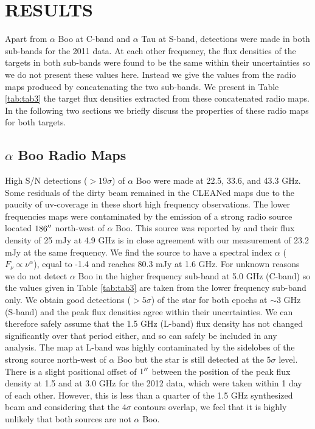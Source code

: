 \documentclass[iop]{emulateapj}
\begin{document}
\section{RESULTS} 

Apart from $\alpha$ Boo at C-band and $\alpha$ Tau at S-band, detections were made in both sub-bands for the 2011 data. At each other frequency, the flux densities of the targets in both sub-bands were found to be the same within their uncertainties so we do not present these values here. Instead we give the values from the radio maps produced by concatenating the two sub-bands. We present in Table \ref{tab:tab3} the target flux densities extracted from these concatenated radio maps. In the following two sections we briefly discuss the properties of these radio maps for both targets.

\subsection{$\alpha$ Boo Radio Maps} \label{results1} 
High S/N detections ($>19\sigma$) of $\alpha$ Boo were made at 22.5, 33.6, and 43.3 GHz. Some residuals of the dirty beam remained in the CLEANed maps due to the paucity of uv-coverage in these short high frequency observations. The lower frequencies maps were contaminated by the emission of a strong radio source located $186\mbox{$^{\prime\prime}$}$ north-west of $\alpha$ Boo. This source was reported by \cite{1986AJ.....91..602D} and their flux density of 25 mJy at 4.9 GHz is in close agreement with our measurement of 23.2 mJy at the same frequency. We find the source to have a spectral index $\alpha$ ($F_{\nu} \propto \nu ^{\alpha}$), equal to -1.4 and reaches 80.3 mJy at 1.6 GHz. For unknown reasons we do not detect $\alpha$ Boo in the higher frequency sub-band at 5.0 GHz (C-band) so the values given in Table \ref{tab:tab3} are taken from the lower frequency sub-band only. We obtain good detections ($>5\sigma$) of the star for both epochs at $\sim$3 GHz (S-band) and the peak flux densities agree within their uncertainties. We can therefore safely assume that the 1.5 GHz (L-band) flux density has not changed significantly over that period either, and so can safely be included in any analysis. The map at L-band was highly contaminated by the sidelobes of the strong source north-west of $\alpha$ Boo but the star is still detected at the $5\sigma$ level. There is a slight positional offset of $1\mbox{$^{\prime\prime}$}$ between the position of the peak flux density at 1.5 and at 3.0 GHz for the 2012 data, which were taken within 1 day of each other. However, this is less than a quarter of the 1.5 GHz synthesized beam and considering that the $4\sigma$ contours overlap, we feel that it is highly unlikely that both sources are not $\alpha$ Boo. 
\end{document}
